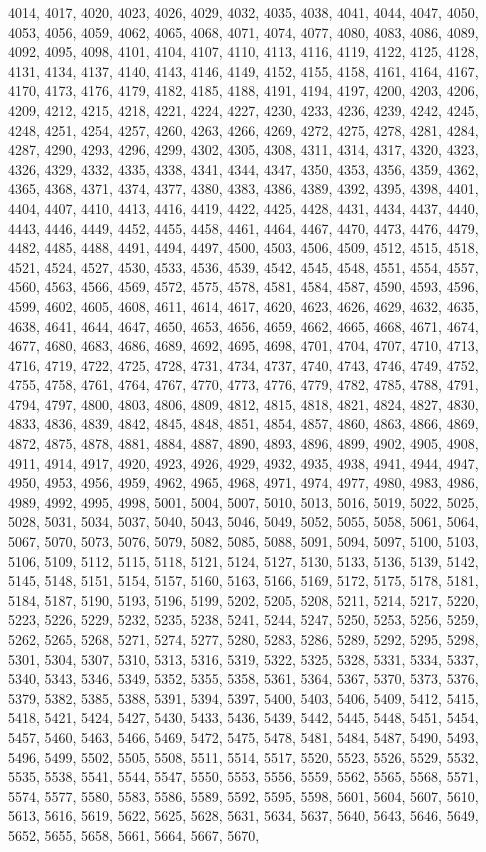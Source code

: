\documentclass[../Cours.tex]{subfiles}
\begin{document}
\begin{questions}
4014, 4017, 4020, 4023, 4026, 4029, 4032, 4035, 4038, 4041, 4044, 4047, 4050, 4053, 4056, 4059, 4062, 4065, 4068, 4071, 4074, 4077, 4080, 4083, 4086, 4089, 4092, 4095, 4098, 4101, 4104, 4107, 4110, 4113, 4116, 4119, 4122, 4125, 4128, 4131, 4134, 4137, 4140, 4143, 4146, 4149, 4152, 4155, 4158, 4161, 4164, 4167, 4170, 4173, 4176, 4179, 4182, 4185, 4188, 4191, 4194, 4197, 4200, 4203, 4206, 4209, 4212, 4215, 4218, 4221, 4224, 4227, 4230, 4233, 4236, 4239, 4242, 4245, 4248, 4251, 4254, 4257, 4260, 4263, 4266, 4269, 4272, 4275, 4278, 4281, 4284, 4287, 4290, 4293, 4296, 4299, 4302, 4305, 4308, 4311, 4314, 4317, 4320, 4323, 4326, 4329, 4332, 4335, 4338, 4341, 4344, 4347, 4350, 4353, 4356, 4359, 4362, 4365, 4368, 4371, 4374, 4377, 4380, 4383, 4386, 4389, 4392, 4395, 4398, 4401, 4404, 4407, 4410, 4413, 4416, 4419, 4422, 4425, 4428, 4431, 4434, 4437, 4440, 4443, 4446, 4449, 4452, 4455, 4458, 4461, 4464, 4467, 4470, 4473, 4476, 4479, 4482, 4485, 4488, 4491, 4494, 4497, 4500, 4503, 4506, 4509, 4512, 4515, 4518, 4521, 4524, 4527, 4530, 4533, 4536, 4539, 4542, 4545, 4548, 4551, 4554, 4557, 4560, 4563, 4566, 4569, 4572, 4575, 4578, 4581, 4584, 4587, 4590, 4593, 4596, 4599, 4602, 4605, 4608, 4611, 4614, 4617, 4620, 4623, 4626, 4629, 4632, 4635, 4638, 4641, 4644, 4647, 4650, 4653, 4656, 4659, 4662, 4665, 4668, 4671, 4674, 4677, 4680, 4683, 4686, 4689, 4692, 4695, 4698, 4701, 4704, 4707, 4710, 4713, 4716, 4719, 4722, 4725, 4728, 4731, 4734, 4737, 4740, 4743, 4746, 4749, 4752, 4755, 4758, 4761, 4764, 4767, 4770, 4773, 4776, 4779, 4782, 4785, 4788, 4791, 4794, 4797, 4800, 4803, 4806, 4809, 4812, 4815, 4818, 4821, 4824, 4827, 4830, 4833, 4836, 4839, 4842, 4845, 4848, 4851, 4854, 4857, 4860, 4863, 4866, 4869, 4872, 4875, 4878, 4881, 4884, 4887, 4890, 4893, 4896, 4899, 4902, 4905, 4908, 4911, 4914, 4917, 4920, 4923, 4926, 4929, 4932, 4935, 4938, 4941, 4944, 4947, 4950, 4953, 4956, 4959, 4962, 4965, 4968, 4971, 4974, 4977, 4980, 4983, 4986, 4989, 4992, 4995, 4998, 5001, 5004, 5007, 5010, 5013, 5016, 5019, 5022, 5025, 5028, 5031, 5034, 5037, 5040, 5043, 5046, 5049, 5052, 5055, 5058, 5061, 5064, 5067, 5070, 5073, 5076, 5079, 5082, 5085, 5088, 5091, 5094, 5097, 5100, 5103, 5106, 5109, 5112, 5115, 5118, 5121, 5124, 5127, 5130, 5133, 5136, 5139, 5142, 5145, 5148, 5151, 5154, 5157, 5160, 5163, 5166, 5169, 5172, 5175, 5178, 5181, 5184, 5187, 5190, 5193, 5196, 5199, 5202, 5205, 5208, 5211, 5214, 5217, 5220, 5223, 5226, 5229, 5232, 5235, 5238, 5241, 5244, 5247, 5250, 5253, 5256, 5259, 5262, 5265, 5268, 5271, 5274, 5277, 5280, 5283, 5286, 5289, 5292, 5295, 5298, 5301, 5304, 5307, 5310, 5313, 5316, 5319, 5322, 5325, 5328, 5331, 5334, 5337, 5340, 5343, 5346, 5349, 5352, 5355, 5358, 5361, 5364, 5367, 5370, 5373, 5376, 5379, 5382, 5385, 5388, 5391, 5394, 5397, 5400, 5403, 5406, 5409, 5412, 5415, 5418, 5421, 5424, 5427, 5430, 5433, 5436, 5439, 5442, 5445, 5448, 5451, 5454, 5457, 5460, 5463, 5466, 5469, 5472, 5475, 5478, 5481, 5484, 5487, 5490, 5493, 5496, 5499, 5502, 5505, 5508, 5511, 5514, 5517, 5520, 5523, 5526, 5529, 5532, 5535, 5538, 5541, 5544, 5547, 5550, 5553, 5556, 5559, 5562, 5565, 5568, 5571, 5574, 5577, 5580, 5583, 5586, 5589, 5592, 5595, 5598, 5601, 5604, 5607, 5610, 5613, 5616, 5619, 5622, 5625, 5628, 5631, 5634, 5637, 5640, 5643, 5646, 5649, 5652, 5655, 5658, 5661, 5664, 5667, 5670, 
\end{questions}
\end{document}
